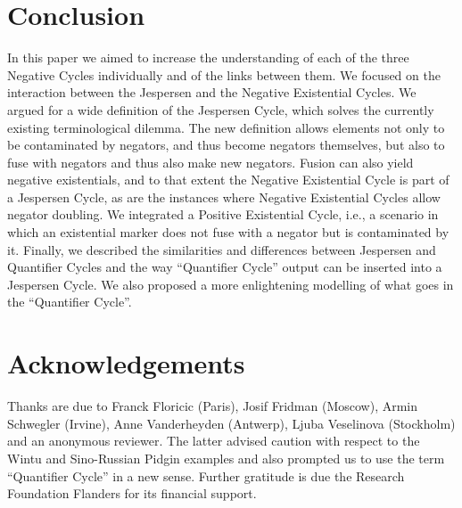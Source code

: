 ﻿\documentclass[output=paper]{langsci/langscibook}
\begin{document}
\section{Conclusion}\label{sec:int-6}

In this paper we aimed to increase the understanding of each of the three
Negative Cycles individually and of the links between them. We focused on
the interaction between the Jespersen and the Negative Existential Cycles.
We argued for a wide definition of the Jespersen Cycle, which solves the
currently existing terminological dilemma. The new definition allows
elements not only to be contaminated by negators, and thus become negators
themselves, but also to fuse with negators and thus also make new negators.
Fusion can also yield negative existentials, and to that extent the
Negative Existential Cycle is part of a Jespersen Cycle, as are the
instances where Negative Existential Cycles allow negator doubling. We
integrated a Positive Existential Cycle, i.e., a scenario in which an
existential marker does not fuse with a negator but is contaminated by it.
Finally, we described the similarities and differences between Jespersen
and Quantifier Cycles and the way ``Quantifier Cycle'' output can be inserted
into a Jespersen Cycle. We also proposed a more enlightening modelling of
what goes in the ``Quantifier Cycle''.

\section*{Acknowledgements} 

Thanks are due to Franck Floricic (Paris), Josif Fridman (Moscow), Armin
Schwegler (Irvine), Anne Vanderheyden (Antwerp), Ljuba Veselinova
(Stockholm) and an anonymous reviewer. The latter advised caution with
respect to the Wintu and Sino-Russian Pidgin examples and also prompted us
to use the term ``Quantifier Cycle'' in a new sense. Further gratitude is
due the Research Foundation Flanders for its financial support.
\end{document}
